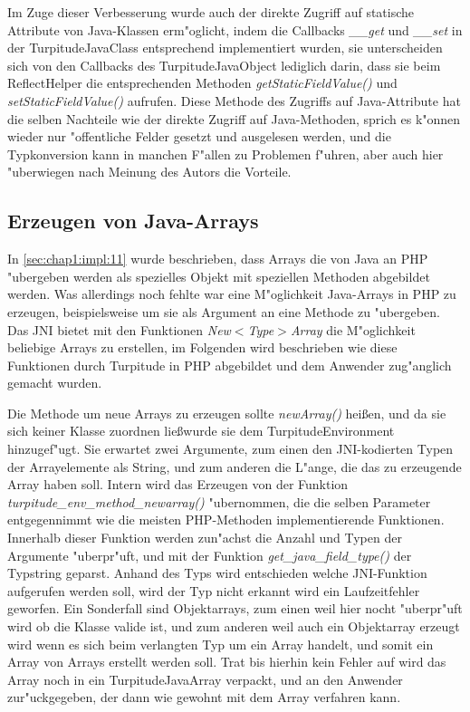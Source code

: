 Im Zuge dieser Verbesserung wurde auch der direkte Zugriff auf statische Attribute von Java-Klassen erm"oglicht, indem die
Callbacks \emph{\_\_get} und \emph{\_\_set} in der TurpitudeJavaClass entsprechend implementiert wurden, sie unterscheiden sich
von den Callbacks des TurpitudeJavaObject lediglich darin, dass sie beim ReflectHelper die entsprechenden Methoden
\emph{getStaticFieldValue()} und \emph{setStaticFieldValue()} aufrufen.
Diese Methode des Zugriffs auf Java-Attribute hat die selben Nachteile wie der direkte Zugriff auf Java-Methoden, sprich es k"onnen
wieder nur "offentliche Felder gesetzt und ausgelesen werden, und die Typkonversion kann in manchen F"allen zu Problemen f"uhren, aber
auch hier "uberwiegen nach Meinung des Autors die Vorteile.

\subsection{Erzeugen von Java-Arrays}
\label{sec:chap1:impl:13}

In \ref{sec:chap1:impl:11} wurde beschrieben, dass Arrays die von Java an PHP "ubergeben werden als spezielles Objekt
mit speziellen Methoden abgebildet werden. Was allerdings noch fehlte war eine M"oglichkeit Java-Arrays in PHP zu erzeugen,
beispielsweise um sie als Argument an eine Methode zu "ubergeben. Das JNI bietet mit den Funktionen \emph{New$<$Type$>$Array}
die M"oglichkeit beliebige Arrays zu erstellen, im Folgenden wird beschrieben wie diese Funktionen durch Turpitude in PHP
abgebildet und dem Anwender zug"anglich gemacht wurden.

Die Methode um neue Arrays zu erzeugen sollte \emph{newArray()} hei\ss en, und da sie sich keiner Klasse zuordnen lie\ss  wurde 
sie dem TurpitudeEnvironment hinzugef"ugt. Sie erwartet zwei Argumente, zum einen den JNI-kodierten Typen der Arrayelemente 
als String, und zum anderen die L"ange, die das zu erzeugende Array haben soll. Intern wird das Erzeugen von der Funktion
\emph{turpitude\_env\_method\_newarray()} "ubernommen, die die selben Parameter entgegennimmt wie die meisten PHP-Methoden
implementierende Funktionen. Innerhalb dieser Funktion werden zun"achst die Anzahl und Typen der Argumente "uberpr"uft, und 
mit der Funktion \emph{get\_java\_field\_type()} der Typstring geparst. Anhand des Typs wird entschieden welche JNI-Funktion
aufgerufen werden soll, wird der Typ nicht erkannt wird ein Laufzeitfehler geworfen. Ein Sonderfall sind Objektarrays, zum einen
weil hier nocht "uberpr"uft wird ob die Klasse valide ist, und zum anderen weil auch ein Objektarray erzeugt wird wenn es sich beim
verlangten Typ um ein Array handelt, und somit ein Array von Arrays erstellt werden soll. Trat bis hierhin kein Fehler auf
wird das Array noch in ein TurpitudeJavaArray verpackt, und an den Anwender zur"uckgegeben, der dann wie gewohnt mit dem Array
verfahren kann.

